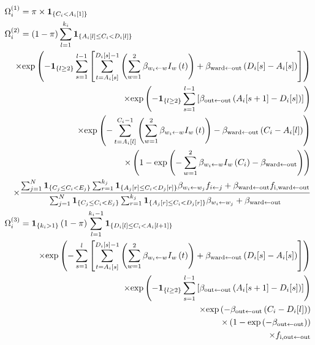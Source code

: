\documentclass[10pt]{article}
\begin{document}
\begin{eqnarray*}
\lefteqn{\Omega_i^{\left(1\right)} = \pi \times \mathbf{1}_{\left\lbrace C_i < A_i[1] \right\rbrace} }\\
\lefteqn{\Omega_i^{\left(2\right)}  = \left( 1-\pi \right) \sum_{l=1}^{k_i} \mathbf{1}_{\left\lbrace A_i[l] \leq C_i < D_i[l] \right\rbrace}}\\
	 && \times \text{exp}\left( - \mathbf{1}_{\left\lbrace l \geq 2 \right\rbrace} \sum_{s=1}^{l-1} \left[ \sum_{t=A_i[s]}^{D_i[s]-1} \left( \sum_{w=1}^{2} \beta_{w_i \leftarrow w} I_w\left(t\right) \right) + \beta_{\text{ward} \leftarrow \text{out}}\left(D_i[s]-A_i[s]\right) \right] \right) \\
	 && \times \text{exp}\left( - \mathbf{1}_{\left\lbrace l \geq 2 \right\rbrace} \sum_{s=1}^{l-1} \left[ \beta_{\text{out} \leftarrow \text{out}}\left(A_i[s+1]-D_i[s]\right) \right] \right) \\
	 && \times \text{exp}\left( - \sum_{t=A_i[l]}^{C_i-1} \left( \sum_{w=1}^{2} \beta_{w_i \leftarrow w} I_w\left(t\right) \right) - \beta_{\text{ward} \leftarrow \text{out}}\left(C_i-A_i[l]\right)  \right) \\
	 && \times \left( 1 - \text{exp}\left( - \sum_{w=1}^{2} \beta_{w_i \leftarrow w} I_w\left(C_i\right) - \beta_{\text{ward} \leftarrow \text{out}} \right) \right) \\
	 && \times \frac{\sum_{j=1}^N \mathbf{1}_{\left\lbrace C_j \leq C_i < E_j \right\rbrace} \sum_{r=1}^{k_j} \mathbf{1}_{\left\lbrace A_j[r] \leq C_i < D_j[r] \right\rbrace} \beta_{w_i \leftarrow w_j} f_{i \leftarrow j} + \beta_{\text{ward} \leftarrow \text{out}}f_{\text{i},\text{ward} \leftarrow \text{out}} }{\sum_{j=1}^N \mathbf{1}_{\left\lbrace C_j \leq C_i < E_j \right\rbrace} \sum_{r=1}^{k_j} \mathbf{1}_{\left\lbrace A_j[r] \leq C_i < D_j[r] \right\rbrace} \beta_{w_i \leftarrow w_j} + \beta_{\text{ward} \leftarrow \text{out}} } \\
\lefteqn{\Omega_i^{\left(3\right)}  = \mathbf{1}_{\left\lbrace k_i > 1 \right\rbrace} \left( 1-\pi \right) \sum_{l=1}^{k_i-1} \mathbf{1}_{\left\lbrace D_i[l] \leq C_i < A_i[l+1] \right\rbrace}}\\
	 && \times \text{exp}\left( - \sum_{s=1}^{l} \left[ \sum_{t=A_i[s]}^{D_i[s]-1} \left( \sum_{w=1}^{2} \beta_{w_i \leftarrow w} I_w\left(t\right) \right) + \beta_{\text{ward} \leftarrow \text{out}}\left(D_i[s]-A_i[s]\right) \right] \right) \\
	 && \times \text{exp}\left( - \mathbf{1}_{\left\lbrace l \geq 2 \right\rbrace} \sum_{s=1}^{l-1} \left[ \beta_{\text{out} \leftarrow \text{out}}\left(A_i[s+1]-D_i[s]\right) \right] \right) \\
	 && \times \text{exp}\left( - \beta_{\text{out} \leftarrow \text{out}}\left(C_i-D_i[l]\right) \right) \\
	 && \times \left( 1 - \text{exp}\left( - \beta_{\text{out} \leftarrow \text{out}} \right) \right) \\
	 && \times f_{\text{i},\text{out} \leftarrow \text{out}}  \\
\end{eqnarray*}
\bigskip
\end{document}
